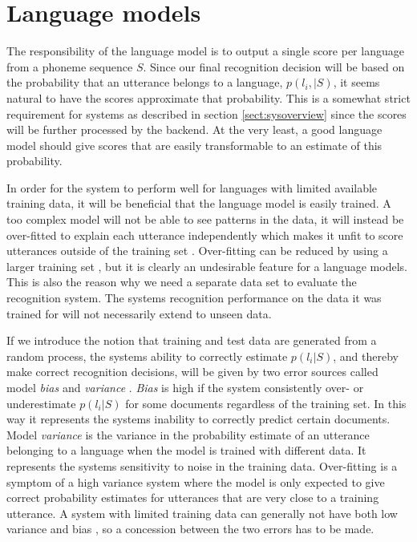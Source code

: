 \section{Language models}
\label{sect:basiclangmodel}

The responsibility of the language model is to output a single score per language from a phoneme sequence $S$. Since our final recognition decision will be based on the probability that an utterance belongs to a language, $p(l_i, | S)$, it seems natural to have the scores approximate that probability. This is a somewhat strict requirement for systems as described in section \ref{sect:sysoverview} since the scores will be further processed by the backend. At the very least, a good language model should give scores that are easily transformable to an estimate of this probability. 

In order for the system to perform well for languages with limited available training data, it will be beneficial that the language model is easily trained. A too complex model will not be able to see patterns in the data, it will instead be over-fitted to explain each utterance independently which makes it unfit to score utterances outside of the training set \cite[311]{information}. Over-fitting can be reduced by using a larger training set \cite[147]{machinelearningbook}, but it is clearly an undesirable feature for a language models. This is also the reason why we need a separate data set to evaluate the recognition system. The systems recognition performance on the data it was trained for will not necessarily extend to unseen data.

If we introduce the notion that training and test data are generated from a random process, the systems ability to correctly estimate $p(l_i | S)$, and thereby make correct recognition decisions, will be given by two error sources called model \emph{bias} and \emph{variance} \cite[149]{machinelearningbook}. \emph{Bias} is high if the system consistently over- or underestimate $p(l_i | S)$ for some documents regardless of the training set. In this way it represents the systems inability to correctly predict certain documents. Model \emph{variance} is the variance in the probability estimate of an utterance belonging to a language when the model is trained with different data. It represents the systems sensitivity to noise in the training data. Over-fitting is a symptom of a high variance system where the model is only expected to give correct probability estimates for utterances that are very close to a training utterance. A system with limited training data can generally not have both low variance and bias \cite[312]{information}, so a concession between the two errors has to be made.

